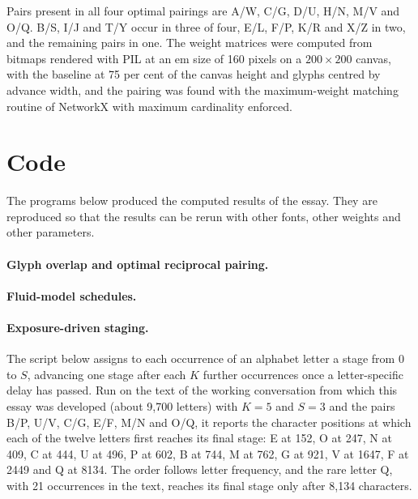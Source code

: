 \begin{table}[ht]
\centering
\small

\caption{Maximum-weight reciprocal pairings of the 26 capitals under the pixel-overlap measure, with the overlap of each pair in parentheses.}
\end{table}

Pairs present in all four optimal pairings are A/W, C/G, D/U, H/N, M/V and O/Q. B/S, I/J and T/Y occur in three of four, E/L, F/P, K/R and X/Z in two, and the remaining pairs in one. The weight matrices were computed from bitmaps rendered with PIL at an em size of 160 pixels on a $200\times200$ canvas, with the baseline at 75 per cent of the canvas height and glyphs centred by advance width, and the pairing was found with the maximum-weight matching routine of NetworkX with maximum cardinality enforced.

\section{Code}\label{app:code}

The programs below produced the computed results of the essay. They are reproduced so that the results can be rerun with other fonts, other weights and other parameters.

\paragraph{Glyph overlap and optimal reciprocal pairing.}


\paragraph{Fluid-model schedules.}


\paragraph{Exposure-driven staging.}
The script below assigns to each occurrence of an alphabet letter a stage from $0$ to $S$, advancing one stage after each $K$ further occurrences once a letter-specific delay has passed. Run on the text of the working conversation from which this essay was developed (about 9{,}700 letters) with $K=5$ and $S=3$ and the pairs B/P, U/V, C/G, E/F, M/N and O/Q, it reports the character positions at which each of the twelve letters first reaches its final stage: E at 152, O at 247, N at 409, C at 444, U at 496, P at 602, B at 744, M at 762, G at 921, V at 1647, F at 2449 and Q at 8134. The order follows letter frequency, and the rare letter Q, with 21 occurrences in the text, reaches its final stage only after 8{,}134 characters.


